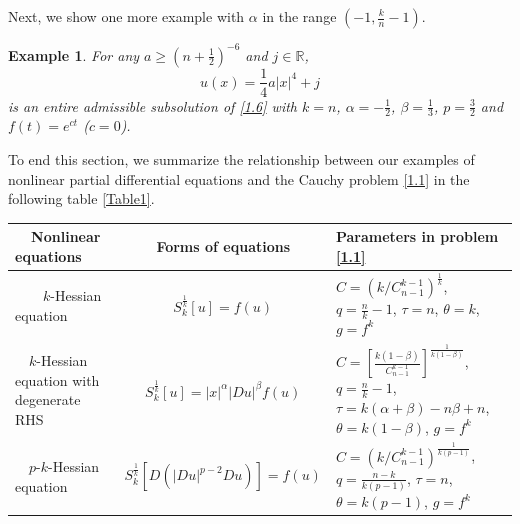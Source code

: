 \documentclass[a4paper,11pt]{amsart}
\theoremstyle{plain}
\newtheorem{Example}{Example}[section]
\theoremstyle{remark}
\numberwithin{equation}{section}
\numberwithin{figure}{section}
\numberwithin{remark}{section}
\begin{document}
\begin{sloppypar}
Next, we show one more example with $\alpha$ in the range $(-1, \frac{k}{n}-1)$. 

\begin{Example}\label{Example 6.6}
For any $a \ge \left( n+\frac{1}{2} \right)^{-6}$ and $j\in \mathbb{R}$, 
\begin{equation}\label{example6}
u(x)=\frac{1}{4}a |x|^4+j
\end{equation} 
is an entire admissible subsolution of \eqref{1.6} with $k=n$, $\alpha=-\frac{1}{2}$, $\beta=\frac{1}{3}$, $p=\frac{3}{2}$ and $f(t)=e^{c t}$ ($c=0$).
\end{Example}




	\vspace{3mm}

    To end this section, we summarize the relationship between our examples of nonlinear partial differential equations and the Cauchy problem \eqref{1.1} in the following table \ref{Table1}.

\begin{table}[!htp]
   \centering
   {
    \linespread{1.5}  \selectfont
    
   \begin{tabular}{|m{3.8cm}|c|m{5cm}|}
        \hline
          { \ \ Nonlinear equations}&  Forms of equations&   Parameters in problem  \eqref{1.1}\\   
        \hline
         \ \ \ \ $k$-Hessian equation&   $S_k^{\frac{1}{k}} [u] = f(u)$& $C=\left (k/C_{n-1}^{k-1} \right )^{\frac{1}{k}}$, $q=\frac{n}{k}-1$, $\tau =n$, $\theta =k$, $g=f^k$\\\hline 
        
        \ \  $k$-Hessian equation with degenerate RHS&   $S_k^{\frac{1}{k}} [u] = |x|^\alpha |Du|^\beta f(u)$&  $C=\left[ \frac{k(1-\beta)}{C_{n-1}^{k-1}} \right]^{\frac{1}{k(1-\beta)}} $, $q=\frac{n}{k}-1$, $\tau =k(\alpha+\beta)-n\beta+n$, \newline $\theta = k(1-\beta)$, $g=f^k$\\\hline
        
        \ \ $p$-$k$-Hessian equation& $S_k^{\frac{1}{k}} [D(|Du|^{p-2}Du)] = f(u)$&  $C=\left (k/C_{n-1}^{k-1} \right )^{\frac{1}{k(p-1)}}$, \newline $q=\frac{n-k}{k(p-1)}$, $\tau =n$, \newline $\theta =k(p-1)$, $g=f^k$\\\hline  
        

\end{tabular}}
\end{table}
\end{sloppypar}
\end{document}
